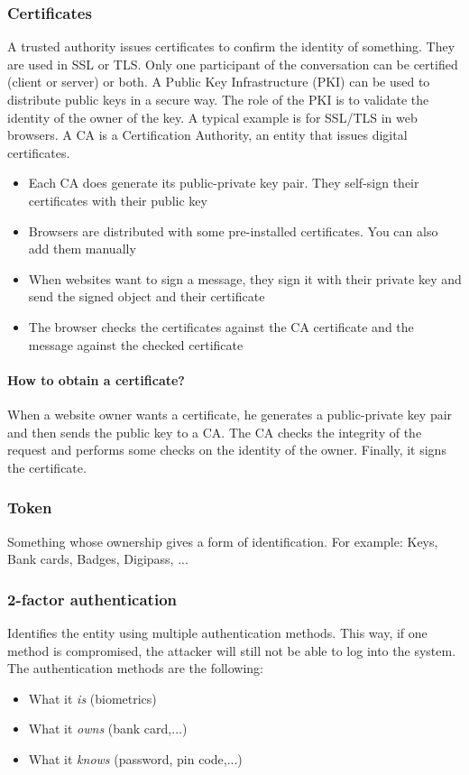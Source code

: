 \subsubsection{Certificates}
A trusted authority issues certificates to confirm the identity of something.
They are used in SSL or TLS.
Only one participant of the conversation can be certified (client or server)
or both.
A Public Key Infrastructure (PKI) can be used to distribute public keys in a
secure way. The role of the PKI is to validate the identity of the owner of
the key.
A typical example is for SSL/TLS in web browsers. A CA is a Certification
Authority, an entity that issues digital certificates.
\begin{itemize}
\item Each CA does generate its public-private key pair. They self-sign their
certificates with their public key
\item Browsers are distributed with some pre-installed certificates. You can
also add them manually
\item When websites want to sign a message, they sign it with their private
key and send the signed object and their certificate
\item The browser checks the certificates against the CA certificate and the
message against the checked certificate
\end{itemize}

\paragraph{How to obtain a certificate?}
When a website owner wants a certificate, he generates a public-private key
pair and then sends the public key to a CA.
The CA checks the integrity of the request and performs some checks on the
identity of the owner. Finally, it signs the certificate.

\subsubsection{Token}
Something whose ownership gives a form of identification.
For example: Keys, Bank cards, Badges, Digipass, ...

\subsubsection{2-factor authentication}
Identifies the entity using multiple authentication methods.
This way, if one method is compromised, the attacker will still not be able to
log into the system.
The authentication methods are the following:
\begin{itemize}
\item What it \emph{is} (biometrics)
\item What it \emph{owns} (bank card,...)
\item What it \emph{knows} (password, pin code,...)
\end{itemize}

